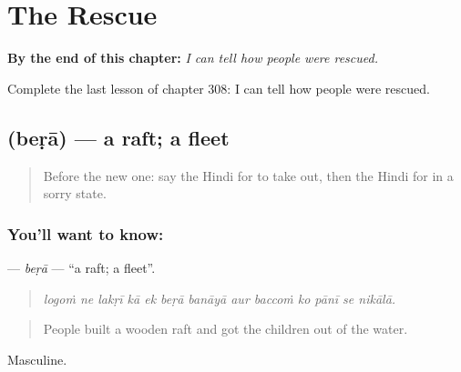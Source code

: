 
\chapter{The Rescue}
\label{ch:hi-the-rescue}

\begin{chapteropening}
\textbf{By the end of this chapter:} \emph{I can tell how people were rescued.}

Complete the last lesson of chapter 308: I can tell how people were rescued.
\end{chapteropening}

\section[\texorpdfstring{\hi{बेड़ा} (beṛā)}{बेड़ा (beṛā)}]{ (beṛā) — a raft; a fleet}

\label{lesson:HI-C308-bera}



\begin{quote}
Before the new one: say the Hindi for to take out, then the Hindi for in a sorry state.
\end{quote}

\subsection*{You'll want to know: }
\textbf{} — \emph{beṛā} — \textquotedblleft{}a raft; a fleet\textquotedblright{}.

\begin{quote}
            
\end{quote}

\begin{quote}
\emph{logoṁ ne lakṛī kā ek beṛā banāyā aur baccoṁ ko pānī se nikālā.}
\end{quote}

\begin{quote}
People built a wooden raft and got the children out of the water.
\end{quote}

Masculine.

